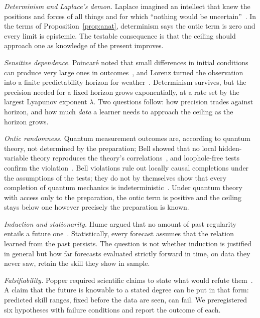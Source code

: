 \documentclass[journal]{IEEEtran}
\theoremstyle{definition}
\begin{document}
\emph{Determinism and Laplace's demon.} Laplace imagined an intellect that knew the positions and forces of all things and for which ``nothing would be uncertain''~\cite{laplace1814essai}. In the terms of Proposition~\ref{prop:anat}, determinism says the ontic term is zero and every limit is epistemic. The testable consequence is that the ceiling should approach one as knowledge of the present improves.

\emph{Sensitive dependence.} Poincar\'e noted that small differences in initial conditions can produce very large ones in outcomes~\cite{poincare1908science}, and Lorenz turned the observation into a finite predictability horizon for weather~\cite{lorenz1963deterministic,lorenz1969predictability}. Determinism survives, but the precision needed for a fixed horizon grows exponentially, at a rate set by the largest Lyapunov exponent $\lambda$. Two questions follow: how precision trades against horizon, and how much \emph{data} a learner needs to approach the ceiling as the horizon grows.

\emph{Ontic randomness.} Quantum measurement outcomes are, according to quantum theory, not determined by the preparation; Bell showed that no local hidden-variable theory reproduces the theory's correlations~\cite{bell1964einstein}, and loophole-free tests confirm the violation~\cite{hensen2015loophole,hensen2016second}. Bell violations rule out locally causal completions under the assumptions of the tests; they do not by themselves show that every completion of quantum mechanics is indeterministic~\cite{norsen2011local}. Under quantum theory with access only to the preparation, the ontic term is positive and the ceiling stays below one however precisely the preparation is known.

\emph{Induction and stationarity.} Hume argued that no amount of past regularity entails a future one~\cite{hume1748enquiry}. Statistically, every forecast assumes that the relation learned from the past persists. The question is not whether induction is justified in general but how far forecasts evaluated strictly forward in time, on data they never saw, retain the skill they show in sample.

\emph{Falsifiability.} Popper required scientific claims to state what would refute them~\cite{popper1959logic}. A claim that the future is knowable to a stated degree can be put in that form: predicted skill ranges, fixed before the data are seen, can fail. We preregistered six hypotheses with failure conditions and report the outcome of each.
\end{document}
